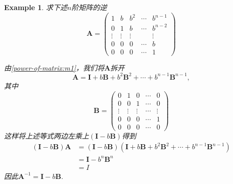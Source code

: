 \documentclass{article}
\newtheorem{example}[theorem]{Example}
\newcommand{\mbf}[1]{\bm{#1}}
\begin{document}
\begin{example}
\rm 求下述$n$阶矩阵的逆
$$
\mbf{A} = 
\begin{pmatrix}
1 & b & b^2 & \cdots & b^{n-1} \\
0 & 1 & b & \cdots & b^{n-2}  \\
\vdots & \vdots & \vdots & & \vdots \\
0 & 0 & 0 & \cdots & b \\
0 & 0 & 0 & \cdots & 1 
\end{pmatrix}
$$

由\ref{power-of-matrix:m1}，我们将$\mbf{A}$拆开
$$
\mbf{A} = \mbf{I} + b\mbf{B}+b^2\mbf{B}^2 + \cdots + b^{n-1}\mbf{B}^{n-1},
$$
其中
$$
\mbf{B} = \begin{pmatrix}
0 & 1 & 0 & \cdots & 0 \\
0 & 0 & 1 & \cdots & 0 \\
\vdots & \vdots & \vdots & \cdots & \vdots \\
0 & 0 & 0 & \cdots & 1 \\
0 & 0 & 0 & \cdots & 0 
\end{pmatrix}
$$
这样将上述等式两边左乘上$(\mbf{I}-b\mbf{B})$得到
$$
\begin{array}{ll}
(\mbf{I}-b\mbf{B})\mbf{A} &= (\mbf{I}-b\mbf{B})(\mbf{I} + b\mbf{B}+b^2\mbf{B}^2 + \cdots + b^{n-1}\mbf{B}^{n-1}) \\
&=\mbf{I}-b^n\mbf{B}^{n} \\
&=I
\end{array}
$$
因此$\mbf{A}^{-1} = \mbf{I}-b\mbf{B}$. 
\end{example}
\end{document}
